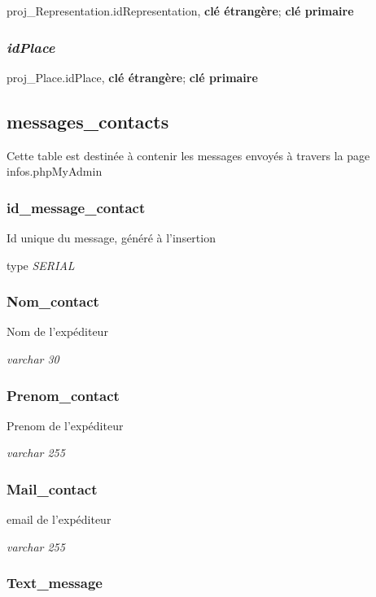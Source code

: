 proj\_Representation.idRepresentation, \textbf{clé étrangère};
\textbf{clé primaire}

\subsubsection{\texorpdfstring{\textbf{\emph{idPlace}}}{idPlace}}\label{idplace-1}

proj\_Place.idPlace, \textbf{clé étrangère}; \textbf{clé primaire}

\subsection{messages\_contacts}\label{messagesux5fcontacts}

Cette table est destinée à contenir les messages envoyés à travers la
page infos.phpMyAdmin

\subsubsection{id\_message\_contact}\label{idux5fmessageux5fcontact}

Id unique du message, généré à l'insertion

type \emph{SERIAL}

\subsubsection{Nom\_contact}\label{nomux5fcontact}

Nom de l'expéditeur

\emph{varchar 30}

\subsubsection{Prenom\_contact}\label{prenomux5fcontact}

Prenom de l'expéditeur

\emph{varchar 255}

\subsubsection{Mail\_contact}\label{mailux5fcontact}

email de l'expéditeur

\emph{varchar 255}

\subsubsection{Text\_message}\label{textux5fmessage}

